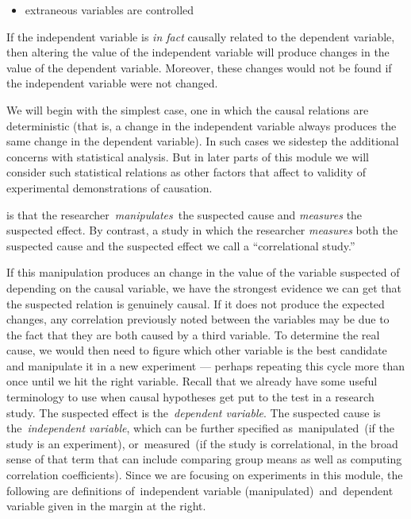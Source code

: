 \begin{refsection}
\begin{itemize}
\item extraneous variables are controlled

\end{itemize}

If the independent variable is \emph{in fact} causally related to the dependent variable, then altering the value of the independent variable will produce changes in the value of the dependent variable. Moreover, these changes would not be found if the independent variable were not changed.

We will begin with the simplest case, one in which the causal relations are deterministic (that is, a change in the independent variable always produces the same change in the dependent variable). In such cases we sidestep the additional concerns with statistical analysis. But in later parts of this module we will consider such statistical relations as other factors that affect to validity of experimental demonstrations of causation.

 is that the researcher \emph{manipulates} the suspected cause and \emph{measures} the suspected effect. By contrast, a study in which the researcher \emph{measures} both the suspected cause and the suspected effect we call a “correlational study.” 

If this manipulation produces an change in the value of the variable suspected of depending on the causal variable, we have the strongest evidence we can get that the suspected relation is genuinely causal. If it does not produce the expected changes, any correlation previously noted between the variables may be due to the fact that they are both caused by a third variable. To determine the real cause, we would then need to figure which other variable is the best candidate and manipulate it in a new experiment — perhaps repeating this cycle more than once until we hit the right variable.
Recall that we already have some useful terminology to use when causal hypotheses get put to the test in a research study. The suspected effect is the \emph{dependent variable}. The suspected cause is the \emph{independent variable}, which can be further specified as manipulated (if the study is an experiment), or measured (if the study is correlational, in the broad sense of that term that can include comparing group means as well as computing correlation coefficients). Since we are focusing on experiments in this module, the following are definitions of independent variable (manipulated) and dependent variable given in the margin at the right.


\end{refsection}
